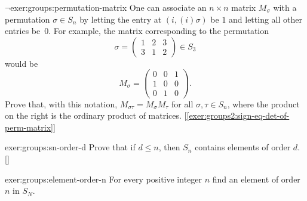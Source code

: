 \begin{exer}{$\lnot$}{exer:groups:permutation-matrix}
  One can associate an $n \times n$ matrix $M_\sigma$ with a
  permutation $\sigma \in S_n$ by letting the entry at
  $(i, (i)\sigma)$ be $1$ and letting all other entries be~$0$. For
  example, the matrix corresponding to the permutation
  \[
    \sigma = \begin{pmatrix}1&2&3\\3&1&2\end{pmatrix} \in S_3
  \]
  would be
  \[
    M_\sigma = \begin{pmatrix}0&0&1\\1&0&0\\0&1&0\end{pmatrix}.
  \]
  Prove that, with this notation, $M_{\sigma\tau} = M_\sigma M_\tau$
  for all $\sigma, \tau \in S_n$, where the product on the right is
  the ordinary product of
  matrices. [\ref{exer:groups2:sign-eq-det-of-perm-matrix}]
\end{exer}
\begin{exer}{\exerused}{exer:groups:sn-order-d}
  Prove that if $d \leq n$, then $S_n$ contains elements of order
  $d$. []
\end{exer}

\begin{exer}{}{exer:groups:element-order-n}
  For every positive integer $n$ find an element of order $n$ in
  $S_N$.
\end{exer}

